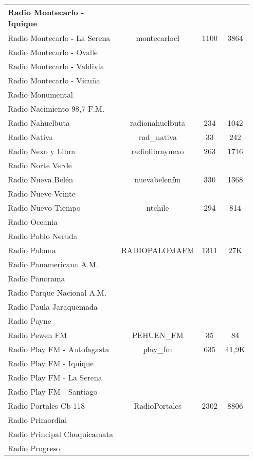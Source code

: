 \begin{center}
\begin{longtable}{| l | c | c | c |}
Radio Montecarlo - Iquique	&		&		&		\\ \hline
Radio Montecarlo - La Serena	&	montecarlocl	&	1100	&	3864	\\ \hline
Radio Montecarlo - Ovalle	&		&		&		\\ \hline
Radio Montecarlo - Valdivia	&		&		&		\\ \hline
Radio Montecarlo - Vicuña	&		&		&		\\ \hline
Radio Monumental	&		&		&		\\ \hline
Radio Nacimiento 98,7 F.M.	&		&		&		\\ \hline
Radio Nahuelbuta	&	radionahuelbuta	&	234	&	1042	\\ \hline
Radio Nativa	&	rad\_nativa	&	33	&	242	\\ \hline
Radio Nexo y Libra	&	radiolibraynexo	&	263	&	1716	\\ \hline
Radio Norte Verde	&		&		&		\\ \hline
Radio Nueva Belén	&	nuevabelenfm	&	330	&	1368	\\ \hline
Radio Nueve-Veinte	&		&		&		\\ \hline
Radio Nuevo Tiempo	&	ntchile	&	294	&	814	\\ \hline
Radio Oceania	&		&		&		\\ \hline
Radio Pablo Neruda	&		&		&		\\ \hline
Radio Paloma	&	RADIOPALOMAFM	&	1311	&	27K	\\ \hline
Radio Panamericana A.M.	&		&		&		\\ \hline
Radio Panorama	&		&		&		\\ \hline
Radio Parque Nacional A.M.	&		&		&		\\ \hline
Radio Paula Jaraquemada	&		&		&		\\ \hline
Radio Payne	&		&		&		\\ \hline
Radio Pewen FM	&	PEHUEN\_FM	&	35	&	84	\\ \hline
Radio Play FM - Antofagasta	&	play\_fm	&	635	&	41,9K	\\ \hline
Radio Play FM - Iquique	&		&		&		\\ \hline
Radio Play FM - La Serena	&		&		&		\\ \hline
Radio Play FM - Santiago	&		&		&		\\ \hline
Radio Portales Cb-118	&	RadioPortales	&	2302	&	8806	\\ \hline
Radio Primordial	&		&		&		\\ \hline
Radio Principal Chuquicamata	&		&		&		\\ \hline
Radio Progreso	&		&		&		\\ \hline

\end{longtable}
\end{center}

